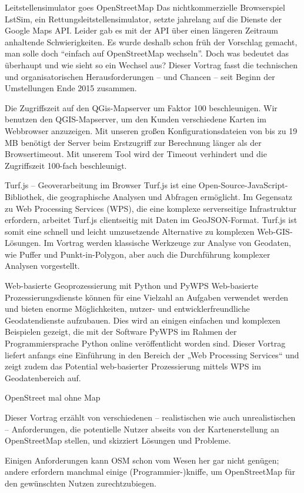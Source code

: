 %
{Leitstellensimulator goes \mbox{OpenStreetMap}}%
{}%
{Das nichtkommerzielle Browserspiel LstSim, ein Rettungsleitstellensimulator, setzte jahrelang auf die Dienste
der Google Maps API. Leider gab es mit der API über einen längeren Zeitraum anhaltende Schwierigkeiten. Es wurde
deshalb schon früh der Vorschlag gemacht, man solle doch "`einfach auf OpenStreetMap wechseln"'. Doch was bedeutet
das überhaupt und wie sieht so ein Wechsel aus? Dieser Vortrag fasst die technischen und organisatorischen
Herausforderungen -- und Chancen -- seit Beginn der Umstellungen Ende 2015 zusammen.}

%
{Die Zugriffszeit auf den QGis-Mapserver um Faktor 100 beschleunigen.}%
{}%
{Wir benutzen den QGIS-Mapserver, um den Kunden verschiedene Karten im
Webbrowser anzuzeigen. Mit unseren großen Konfigurationsdateien von bis
zu 19\,MB benötigt der Server beim Erstzugriff zur Berechnung länger als
der Browsertimeout. Mit unserem Tool wird der Timeout verhindert und die
Zugriffszeit 100-fach beschleunigt.}

%
{Turf.js -- Geoverarbeitung im \mbox{Browser}}%
{}%
{Turf.js ist eine Open-Source-JavaScript-Bibliothek, die geographische Analysen und Abfragen ermöglicht.
Im Gegensatz zu Web Processing Services (WPS), die eine komplexe serverseitige Infrastruktur erfordern,
arbeitet Turf.js clientseitig mit Daten im GeoJSON-Format. Turf.js ist somit eine schnell und leicht
umzusetzende Alternative zu komplexen Web-GIS-Lösungen.
Im Vortrag werden klassische Werkzeuge zur Analyse von Geodaten, wie Puffer und Punkt-in-Polygon, aber auch
die Durchführung komplexer Analysen vorgestellt.}

%
{Web-basierte Geoprozessierung \newline mit Python und PyWPS}%
{}%
{Web-basierte Prozessierungsdienste können für eine Vielzahl an Aufgaben verwendet werden und bieten enorme Möglichkeiten,
nutzer- und entwicklerfreundliche Geodatendienste aufzubauen. Dies wird an einigen einfachen und komplexen Beispielen gezeigt,
die mit der Software PyWPS im Rahmen der Programmiersprache Python online veröffentlicht worden sind.
Dieser Vortrag liefert anfangs eine Einführung in den Bereich der „Web Processing Services“ und zeigt
zudem das Potential web-basierter Prozessierung mittels WPS im Geodatenbereich auf. }

%
{OpenStreet mal ohne Map}%
{}%
{Dieser Vortrag erzählt von verschiedenen -- realistischen wie auch unrealistischen -- Anforderungen,
die potentielle Nutzer abseits von der Kartenerstellung an OpenStreetMap stellen, und skizziert Lösungen und Probleme.

Einigen Anforderungen kann OSM schon vom Wesen her gar nicht
genügen; andere erfordern manchmal einige (Programmier-)kniffe, um
OpenStreetMap für den gewünschten Nutzen zurechtzubiegen.}


